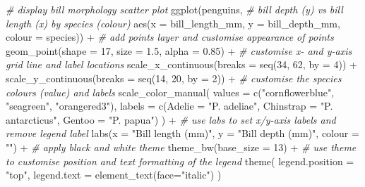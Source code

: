 \documentclass[
]{book}
\newenvironment{Shaded}{\begin{snugshade}}{\end{snugshade}}
\newcommand{\AttributeTok}[1]{\textcolor[rgb]{0.77,0.63,0.00}{#1}}
\newcommand{\CommentTok}[1]{\textcolor[rgb]{0.56,0.35,0.01}{\textit{#1}}}
\newcommand{\DecValTok}[1]{\textcolor[rgb]{0.00,0.00,0.81}{#1}}
\newcommand{\FloatTok}[1]{\textcolor[rgb]{0.00,0.00,0.81}{#1}}
\newcommand{\FunctionTok}[1]{\textcolor[rgb]{0.00,0.00,0.00}{#1}}
\newcommand{\NormalTok}[1]{#1}
\newcommand{\SpecialCharTok}[1]{\textcolor[rgb]{0.00,0.00,0.00}{#1}}
\newcommand{\StringTok}[1]{\textcolor[rgb]{0.31,0.60,0.02}{#1}}
\begin{document}
\begin{Shaded}
\begin{Highlighting}[]
\CommentTok{\# display bill morphology scatter plot}
\FunctionTok{ggplot}\NormalTok{(penguins, }
       \CommentTok{\# bill depth (y) vs bill length (x) by species (colour)}
       \FunctionTok{aes}\NormalTok{(}\AttributeTok{x =}\NormalTok{ bill\_length\_mm, }\AttributeTok{y =}\NormalTok{ bill\_depth\_mm, }\AttributeTok{colour =}\NormalTok{ species)) }\SpecialCharTok{+} 
  \CommentTok{\# add points layer and customise appearance of points}
  \FunctionTok{geom\_point}\NormalTok{(}\AttributeTok{shape =} \DecValTok{17}\NormalTok{, }\AttributeTok{size =} \FloatTok{1.5}\NormalTok{, }\AttributeTok{alpha =} \FloatTok{0.85}\NormalTok{) }\SpecialCharTok{+} 
  \CommentTok{\# customise x{-} and y{-}axis grid line and label locations}
  \FunctionTok{scale\_x\_continuous}\NormalTok{(}\AttributeTok{breaks =} \FunctionTok{seq}\NormalTok{(}\DecValTok{34}\NormalTok{, }\DecValTok{62}\NormalTok{, }\AttributeTok{by =} \DecValTok{4}\NormalTok{)) }\SpecialCharTok{+}
  \FunctionTok{scale\_y\_continuous}\NormalTok{(}\AttributeTok{breaks =} \FunctionTok{seq}\NormalTok{(}\DecValTok{14}\NormalTok{, }\DecValTok{20}\NormalTok{, }\AttributeTok{by =} \DecValTok{2}\NormalTok{)) }\SpecialCharTok{+} 
  \CommentTok{\# customise the species colours (\textquotesingle{}value\textquotesingle{}) and labels}
  \FunctionTok{scale\_color\_manual}\NormalTok{(}
    \AttributeTok{values =} \FunctionTok{c}\NormalTok{(}\StringTok{"cornflowerblue"}\NormalTok{, }\StringTok{"seagreen"}\NormalTok{, }\StringTok{"orangered3"}\NormalTok{),}
    \AttributeTok{labels =} \FunctionTok{c}\NormalTok{(}\AttributeTok{Adelie =} \StringTok{"P. adeliae"}\NormalTok{, }\AttributeTok{Chinstrap =} \StringTok{"P. antarcticus"}\NormalTok{, }\AttributeTok{Gentoo =} \StringTok{"P. papua"}\NormalTok{)}
\NormalTok{  ) }\SpecialCharTok{+}
  \CommentTok{\# use \textasciigrave{}labs\textasciigrave{} to set x/y{-}axis labels and remove legend label}
  \FunctionTok{labs}\NormalTok{(}\AttributeTok{x =} \StringTok{"Bill length (mm)"}\NormalTok{, }\AttributeTok{y =} \StringTok{"Bill depth (mm)"}\NormalTok{, }\AttributeTok{colour =} \StringTok{""}\NormalTok{) }\SpecialCharTok{+}
  \CommentTok{\# apply \textquotesingle{}black and white\textquotesingle{} theme}
  \FunctionTok{theme\_bw}\NormalTok{(}\AttributeTok{base\_size =} \DecValTok{13}\NormalTok{) }\SpecialCharTok{+}
  \CommentTok{\# use theme to customise position and text formatting of the legend}
  \FunctionTok{theme}\NormalTok{(}
    \AttributeTok{legend.position =} \StringTok{"top"}\NormalTok{,}
    \AttributeTok{legend.text =} \FunctionTok{element\_text}\NormalTok{(}\AttributeTok{face=}\StringTok{"italic"}\NormalTok{)}
\NormalTok{  )}
\end{Highlighting}
\end{Shaded}
\end{document}
